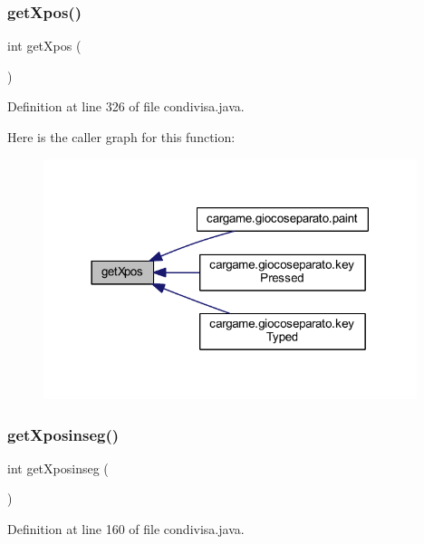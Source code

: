 \subsubsection{\texorpdfstring{get\+Xpos()}{getXpos()}}
{\footnotesize\ttfamily int get\+Xpos (\begin{DoxyParamCaption}{ }\end{DoxyParamCaption})}



Definition at line 326 of file condivisa.\+java.

Here is the caller graph for this function\+:
\nopagebreak
\begin{figure}[H]
\begin{center}
\leavevmode
\includegraphics[width=309pt]{classcargame_1_1condivisa_a3e38fd4d482650ff5fbb4ed8482de884_icgraph}
\end{center}
\end{figure}
\mbox{\label{classcargame_1_1condivisa_a97e507b46357fcce6770312f772fc347}} 
\subsubsection{\texorpdfstring{get\+Xposinseg()}{getXposinseg()}}
{\footnotesize\ttfamily int get\+Xposinseg (\begin{DoxyParamCaption}{ }\end{DoxyParamCaption})}



Definition at line 160 of file condivisa.\+java.

